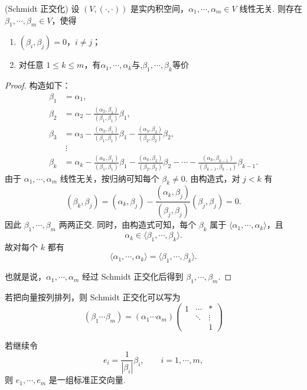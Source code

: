 \begin{theorem}(Schmidt 正交化)
	设 $(V,(\cdot,\cdot))$ 是实内积空间，$\alpha_1,\cdots,\alpha_m\in V$ 线性无关. 则存在 $\beta_1,\cdots,\beta_m\in V$，使得
	\begin{enumerate}
		\item $(\beta_i,\beta_j)=0$，$i\ne j$；
		\item 对任意 $1\leqslant k\leqslant m$，有$\alpha_1,\cdots,\alpha_k $与,$\beta_1,\cdots,\beta_k $等价
	\end{enumerate}
\end{theorem}
\begin{proof}
	构造如下：
	\[
	\begin{aligned}
		\beta_1&=\alpha_1,\\
		\beta_2&=\alpha_2-\frac{(\alpha_2,\beta_1)}{(\beta_1,\beta_1)}\beta_1,\\
		\beta_3&=\alpha_3-\frac{(\alpha_3,\beta_1)}{(\beta_1,\beta_1)}\beta_1
		-
		\frac{(\alpha_3,\beta_2)}{(\beta_2,\beta_2)}\beta_2,\\
		&\ \vdots\\
		\beta_k&=\alpha_k-\frac{(\alpha_k,\beta_1)}{(\beta_1,\beta_1)}\beta_1
		-\frac{(\alpha_k,\beta_2)}{(\beta_2,\beta_2)}\beta_2-\cdots-
		\frac{(\alpha_k,\beta_{k-1})}{(\beta_{k-1},\beta_{k-1})}\beta_{k-1}.
	\end{aligned}
	\]
	由于 $\alpha_1,\cdots,\alpha_m$ 线性无关，按归纳可知每个 $\beta_k\ne0$. 由构造式，对 $j<k$ 有
	\[
	(\beta_k,\beta_j)
	=(\alpha_k,\beta_j)-\frac{(\alpha_k,\beta_j)}{(\beta_j,\beta_j)}(\beta_j,\beta_j)=0.
	\]
	因此 $\beta_1,\cdots,\beta_m$ 两两正交. 同时，由构造式可知，每个 $\beta_k$ 属于 $\langle\alpha_1,\cdots,\alpha_k\rangle$，且
	\[
	\alpha_k\in\langle\beta_1,\cdots,\beta_k\rangle.
	\]
	故对每个 $k$ 都有
	\[
	\langle\alpha_1,\cdots,\alpha_k\rangle=\langle\beta_1,\cdots,\beta_k\rangle.
	\]


	也就是说，$\alpha_1,\cdots,\alpha_m$ 经过 Schmidt 正交化后得到 $\beta_1,\cdots,\beta_m$.
\end{proof}


	若把向量按列排列，则 Schmidt 正交化可以写为
		\[\left(\beta_1 \cdots \beta_m\right)=\left(\alpha_1 \cdots \alpha_m\right)\left(\begin{array}{ccc}
		1 & \cdots & * \\
		& \ddots & \vdots \\
		& & 1
	\end{array}\right) \]
	
	若继续令
	\[
	e_i=\frac{1}{|\beta_i|}\beta_i,
	\qquad i=1,\cdots,m,
	\]
	则 $e_1,\cdots,e_m$ 是一组标准正交向量.


